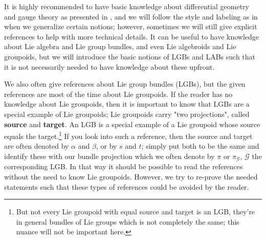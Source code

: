 \documentclass[a4paper,oneside,11pt,bibliography=totoc]{scrartcl}
\theoremstyle{plain}
\theoremstyle{remark}
\theoremstyle{definition}
\begin{document}
It is highly recommended to have basic knowledge about differential geometry and gauge theory as presented in \cite[especially Chapter 1 to 5]{Hamilton}, and we will follow the style and labeling as in \cite{Hamilton} when we generalize certain notions; however, sometimes we will still give explicit references to help with more technical details. It can be useful to have knowledge about Lie algebra and Lie group bundles, and even Lie algebroids and Lie groupoids, but we will introduce the basic notions of LGBs and LABs such that it is not necessarily needed to have knowledge about these upfront.

We also often give references about Lie group bundles (LGBs), but the given references are most of the time about Lie groupoids. If the reader has no knowledge about Lie groupoids, then it is important to know that LGBs are a special example of Lie groupoids; Lie groupoids carry "two projections", called \textbf{source} and \textbf{target}. An LGB is a special example of a Lie groupoid whose source equals the target.\footnote{But not every Lie groupoid with equal source and target is an LGB, they're in general bundles of Lie groups which is not completely the same; this nuance will not be important here.} If you look into such a reference, then the source and target are often denoted by $\alpha$ and $\beta$, or by $s$ and $t$; simply put both to be the same and identify these with our bundle projection which we often denote by $\pi$ or $\pi_{\mathcal{G}}$, $\mathcal{G}$ the corresponding LGB. In that way it should be possible to read the references without the need to know Lie groupoids. However, we try to re-prove the needed statements such that these types of references could be avoided by the reader.
\end{document}
